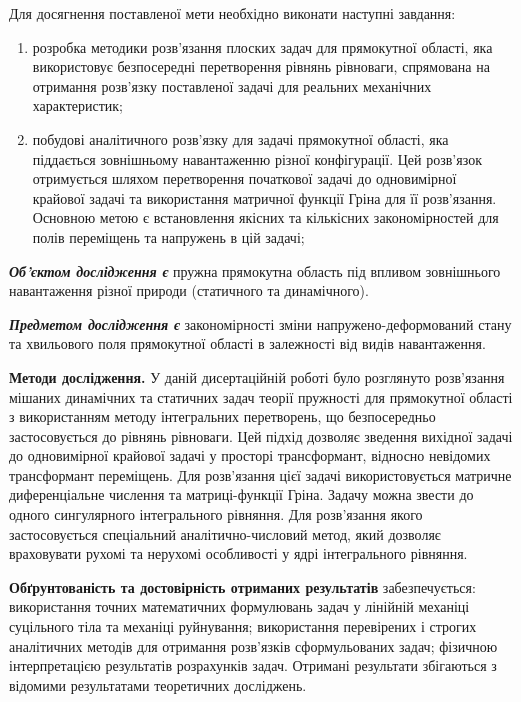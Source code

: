 Для досягнення поставленої мети необхідно виконати наступні завдання:
\begin{enumerate}
    \item розробка методики розв'язання плоских задач для прямокутної області, яка використовує безпосередні перетворення рівнянь рівноваги,
    спрямована на отримання розв'язку поставленої задачі для реальних механічних характеристик;
    \item побудові аналітичного розв'язку для задачі прямокутної області, яка піддається зовнішньому навантаженню різної конфігурації.
    Цей розв'язок отримується шляхом перетворення початкової задачі до одновимірної крайової задачі та використання матричної функції Гріна для її розв'язання.
    Основною метою є встановлення якісних та кількісних закономірностей для полів переміщень та напружень в цій задачі;
\end{enumerate}

\textit{\textbf{Об’єктом дослідження є}}
пружна прямокутна область під впливом зовнішнього навантаження різної природи (статичного та динамічного).

\textit{\textbf{Предметом дослідження є}}
закономірності зміни напружено-деформований стану та хвильового поля прямокутної області в залежності від видів навантаження.

\textbf{Методи дослідження.}
У даній дисертаційній роботі було розглянуто розв'язання мішаних динамічних та статичних задач теорії пружності для прямокутної області з використанням методу інтегральних перетворень,
що безпосередньо застосовується до рівнянь рівноваги. Цей підхід дозволяє зведення вихідної задачі до одновимірної крайової задачі у просторі трансформант,
відносно невідомих трансформант переміщень. Для розв'язання цієї задачі використовується матричне диференціальне числення та матриці-функції Гріна.
Задачу можна звести до одного сингулярного інтегрального рівняння. Для розв'язання якого застосовується спеціальний аналітично-числовий метод, який дозволяє враховувати рухомі та нерухомі особливості у ядрі інтегрального рівняння.

\textbf{Обґрунтованість та достовірність отриманих результатів} забезпечується:
використання точних математичних формулювань задач у лінійній механіці суцільного тіла та механіці руйнування;
використання перевірених і строгих аналітичних методів для отримання розв'язків сформульованих задач;
фізичною інтерпретацією результатів розрахунків задач.
Отримані результати збігаються з відомими результатами теоретичних досліджень.

